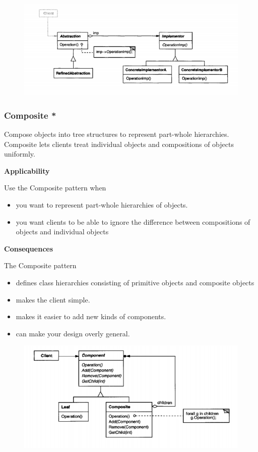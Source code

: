 \documentclass{article}
\begin{document}
\begin{figure}[h]
    \centering
    \includegraphics[width=14cm]{diagrams/pattern-7-bridge.png}
\end{figure}

\newpage
\subsubsection{Composite *}
Compose objects into tree structures to represent part-whole hierarchies. Composite lets clients treat individual objects and compositions of objects
uniformly.

\textbf{Applicability}

Use the Composite pattern when
\begin{itemize}
    \item you want to represent part-whole hierarchies of objects.
    \item you want clients to be able to ignore the difference between compositions of objects and individual objects
\end{itemize}

\textbf{Consequences}

The Composite pattern
\begin{itemize}
    \item defines class hierarchies consisting of primitive objects and composite objects
    \item makes the client simple.
    \item makes it easier to add new kinds of components.
    \item can make your design overly general.
\end{itemize}

\begin{figure}[h]
    \centering
    \includegraphics[width=14cm]{diagrams/pattern-8-composite.png}
\end{figure}
\end{document}
